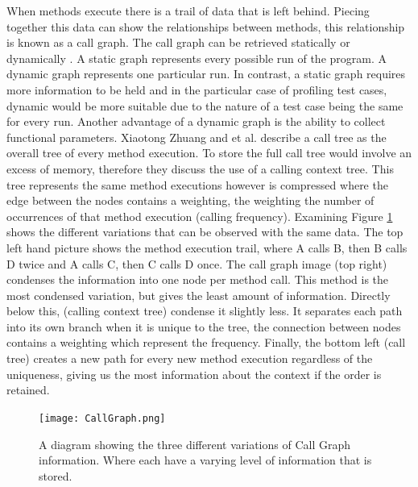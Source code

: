 When methods execute there is a trail of data that is left behind. Piecing together this data can show the relationships between methods, this relationship is known as a call graph. The call graph can be retrieved statically or dynamically \cite{graham1982gprof}. A static graph represents every possible run of the program. A dynamic graph represents one particular run. In contrast, a static graph requires more information to be held and in the particular case of profiling test cases, dynamic would be more suitable due to the nature of a test case being the same for every run. Another advantage of a dynamic graph is the ability to collect functional parameters. Xiaotong Zhuang and et al. \cite{Zhuang06accurate} describe a call tree as the overall tree of every method execution. To store the full call tree would involve an excess of memory, therefore they discuss the use of a calling context tree. This tree represents the same method executions however is compressed where the edge between the nodes contains a weighting, the weighting the number of occurrences of that method execution (calling frequency). Examining Figure \ref{fig:callgraph} shows the different variations that can be observed with the same data. The top left hand picture shows the method execution trail, where A calls B, then B calls D twice and A calls C, then C calls D once. The call graph image (top right) condenses the information into one node per method call. This method is the most condensed variation, but gives the least amount of information. Directly below this, (calling context tree) condense it slightly less. It separates each path into its own branch when it is unique to the tree, the connection between nodes contains a weighting which represent the frequency. Finally, the bottom left (call tree) creates a new path for every new method execution regardless of the uniqueness, giving us the most information about the context if the order is retained.

\begin{figure}[h]
\begin{center}
\texttt{[image: CallGraph.png]}
\end{center}
\caption{A diagram showing the three different variations of Call Graph information. Where  each have a varying level of information that is stored.}
\label{fig:callgraph}
\end{figure}



